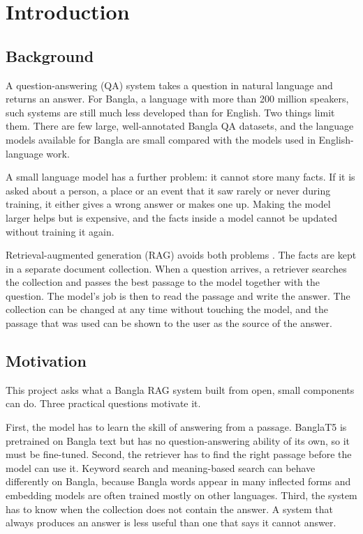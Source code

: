 \chapter{Introduction}

\section{Background}

A question-answering (QA) system takes a question in natural language and returns an answer. For Bangla, a language with more than 200 million speakers, such systems are still much less developed than for English. Two things limit them. There are few large, well-annotated Bangla QA datasets, and the language models available for Bangla are small compared with the models used in English-language work.

A small language model has a further problem: it cannot store many facts. If it is asked about a person, a place or an event that it saw rarely or never during training, it either gives a wrong answer or makes one up. Making the model larger helps but is expensive, and the facts inside a model cannot be updated without training it again.

Retrieval-augmented generation (RAG) avoids both problems \cite{lewis2020rag}. The facts are kept in a separate document collection. When a question arrives, a retriever searches the collection and passes the best passage to the model together with the question. The model's job is then to read the passage and write the answer. The collection can be changed at any time without touching the model, and the passage that was used can be shown to the user as the source of the answer.

\section{Motivation}

This project asks what a Bangla RAG system built from open, small components can do. Three practical questions motivate it.

First, the model has to learn the skill of answering from a passage. BanglaT5 \cite{bhattacharjee2023banglat5} is pretrained on Bangla text but has no question-answering ability of its own, so it must be fine-tuned. Second, the retriever has to find the right passage before the model can use it. Keyword search and meaning-based search can behave differently on Bangla, because Bangla words appear in many inflected forms and embedding models are often trained mostly on other languages. Third, the system has to know when the collection does not contain the answer. A system that always produces an answer is less useful than one that says it cannot answer.

